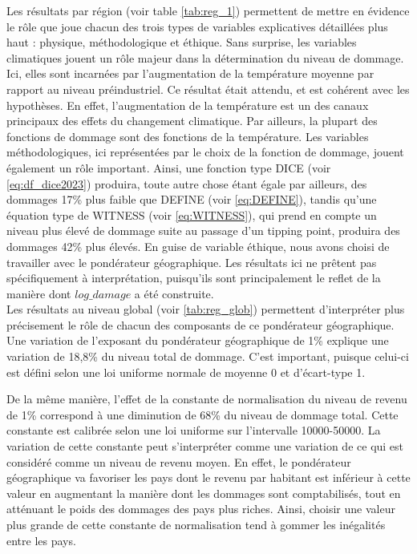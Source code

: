 Les résultats par région (voir table \ref{tab:reg_1}) permettent de mettre en évidence le rôle que joue chacun des trois types de variables explicatives détaillées plus haut : physique, méthodologique et éthique. 
Sans surprise, les variables climatiques jouent un rôle majeur dans la détermination du niveau de dommage. Ici, elles sont incarnées par l'augmentation de la température moyenne par rapport au niveau préindustriel. Ce résultat était attendu, et est cohérent avec les hypothèses. En effet, l'augmentation de la température est un des canaux principaux des effets du changement climatique. Par ailleurs, la plupart des fonctions de dommage sont des fonctions de la température. 
Les variables méthodologiques, ici représentées par le choix de la fonction de dommage, jouent également un rôle important. Ainsi, une fonction type DICE (voir \ref{eq:df_dice2023}) produira, toute autre chose étant égale par ailleurs, des dommages 17\% plus faible que DEFINE (voir \ref{eq:DEFINE}), tandis qu'une équation type de WITNESS (voir \ref{eq:WITNESS}), qui prend en compte un niveau plus élevé de dommage suite au passage d'un tipping point, produira des dommages 42\% plus élevés. 
En guise de variable éthique, nous avons choisi de travailler avec le pondérateur géographique. Les résultats ici ne prêtent pas spécifiquement à interprétation, puisqu'ils sont principalement le reflet de la manière dont $log\_damage$ a été construite. \\

Les résultats au niveau global (voir \ref{tab:reg_glob}) permettent d'interpréter plus précisement le rôle de chacun des composants de ce pondérateur géographique. Une variation de l'exposant du pondérateur géographique de 1\% explique une variation de 18,8\% du niveau total de dommage. C'est important, puisque celui-ci est défini selon une loi uniforme normale de moyenne 0 et d'écart-type 1.

De la même manière, l'effet de la constante de normalisation du niveau de revenu de 1\% correspond à une diminution de 68\% du niveau de dommage
total. Cette constante est calibrée selon une loi uniforme sur l'intervalle 10000-50000. La variation de cette constante peut s'interpréter comme une variation de ce qui est considéré comme un niveau de revenu moyen. En effet, le pondérateur géographique va favoriser les pays dont le revenu par habitant est inférieur à cette valeur en augmentant la manière dont les dommages sont comptabilisés, tout en atténuant le poids des dommages des pays plus riches. Ainsi, choisir une valeur plus grande de cette constante de normalisation tend à gommer les inégalités entre les pays. 

